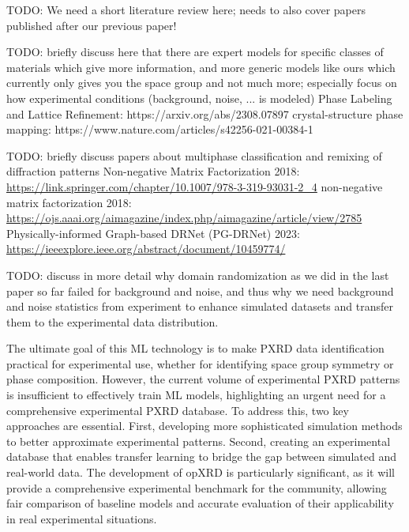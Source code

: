 TODO: We need a short literature review here; needs to also cover papers published after our previous paper!

TODO: briefly discuss here that there are expert models for specific classes of materials which give more information, and more generic models like ours which currently only gives you the space group and not much more; especially focus on how experimental conditions (background, noise, ... is modeled)
Phase Labeling and Lattice Refinement: https://arxiv.org/abs/2308.07897
crystal-structure phase mapping: https://www.nature.com/articles/s42256-021-00384-1


TODO: briefly discuss papers about multiphase classification and remixing of diffraction patterns
Non-negative Matrix Factorization 2018: \url{https://link.springer.com/chapter/10.1007/978-3-319-93031-2_4}
non-negative matrix factorization 2018: \url{https://ojs.aaai.org/aimagazine/index.php/aimagazine/article/view/2785}
Physically-informed Graph-based DRNet (PG-DRNet) 2023: \url{https://ieeexplore.ieee.org/abstract/document/10459774/}

TODO: discuss in more detail why domain randomization as we did in the last paper so far failed for background and noise, and thus why we need background and noise statistics from experiment to enhance simulated datasets and transfer them to the experimental data distribution.

The ultimate goal of this ML technology is to make PXRD data identification practical for experimental use, whether for identifying space group symmetry or phase composition. However, the current volume of experimental PXRD patterns is insufficient to effectively train ML models, highlighting an urgent need for a comprehensive experimental PXRD database. To address this, two key approaches are essential. First, developing more sophisticated simulation methods to better approximate experimental patterns\cite{cao2024simxrd}. Second, creating an experimental database that enables transfer learning to bridge the gap between simulated and real-world data. The development of opXRD is particularly significant, as it will provide a comprehensive experimental benchmark for the community, allowing fair comparison of baseline models and accurate evaluation of their applicability in real experimental situations.